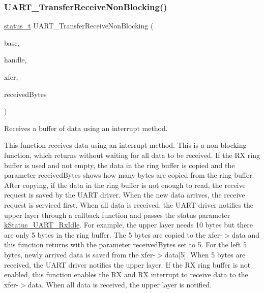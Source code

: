 \subsubsection{\texorpdfstring{UART\_TransferReceiveNonBlocking()}{UART\_TransferReceiveNonBlocking()}}
{\footnotesize\ttfamily \mbox{\hyperlink{group__ksdk__common_gaaabdaf7ee58ca7269bd4bf24efcde092}{status\+\_\+t}} U\+A\+R\+T\+\_\+\+Transfer\+Receive\+Non\+Blocking (\begin{DoxyParamCaption}\item[{\mbox{\hyperlink{struct_u_a_r_t___type}{U\+A\+R\+T\+\_\+\+Type}} $\ast$}]{base,  }\item[{\mbox{\hyperlink{struct__uart__handle}{uart\+\_\+handle\+\_\+t}} $\ast$}]{handle,  }\item[{\mbox{\hyperlink{group__uart__driver_gae245db88e02822f416e4d246d49076df}{uart\+\_\+transfer\+\_\+t}} $\ast$}]{xfer,  }\item[{size\+\_\+t $\ast$}]{received\+Bytes }\end{DoxyParamCaption})}



Receives a buffer of data using an interrupt method. 

This function receives data using an interrupt method. This is a non-\/blocking function, which returns without waiting for all data to be received. If the RX ring buffer is used and not empty, the data in the ring buffer is copied and the parameter {\ttfamily received\+Bytes} shows how many bytes are copied from the ring buffer. After copying, if the data in the ring buffer is not enough to read, the receive request is saved by the U\+A\+RT driver. When the new data arrives, the receive request is serviced first. When all data is received, the U\+A\+RT driver notifies the upper layer through a callback function and passes the status parameter \mbox{\hyperlink{group__uart__driver_ggacef40dc8e8ac174bfe40ebcbc980f84bae0877b14627ed2aa8ddb2bf5b033f407}{k\+Status\+\_\+\+U\+A\+R\+T\+\_\+\+Rx\+Idle}}. For example, the upper layer needs 10 bytes but there are only 5 bytes in the ring buffer. The 5 bytes are copied to the xfer-\/$>$data and this function returns with the parameter {\ttfamily received\+Bytes} set to 5. For the left 5 bytes, newly arrived data is saved from the xfer-\/$>$data\mbox{[}5\mbox{]}. When 5 bytes are received, the U\+A\+RT driver notifies the upper layer. If the RX ring buffer is not enabled, this function enables the RX and RX interrupt to receive data to the xfer-\/$>$data. When all data is received, the upper layer is notified.


